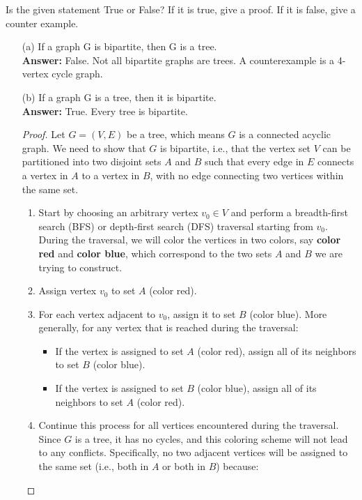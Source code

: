 \documentclass[12pt]{article}
\begin{document}
Is the given statement True or False? If it is true, give a proof. If it is false, give a counter example.
\begin{itemize}
    \item[(a)] If a graph G is bipartite, then G is a tree. \\
    \textbf{Answer:} False. Not all bipartite graphs are trees. A counterexample is a 4-vertex cycle graph.
    \item[(b)] If a graph G is a tree, then it is bipartite. \\
    \textbf{Answer:} True. Every tree is bipartite.
    \begin{proof}
    Let \( G = (V, E) \) be a tree, which means \( G \) is a connected acyclic graph. We need to show that \( G \) is bipartite, i.e., that the vertex set \( V \) can be partitioned into two disjoint sets \( A \) and \( B \) such that every edge in \( E \) connects a vertex in \( A \) to a vertex in \( B \), with no edge connecting two vertices within the same set.
    \begin{enumerate}
        \item Start by choosing an arbitrary vertex \( v_0 \in V \) and perform a breadth-first search (BFS) or depth-first search (DFS) traversal starting from \( v_0 \). During the traversal, we will color the vertices in two colors, say \textbf{color red} and \textbf{color blue}, which correspond to the two sets \( A \) and \( B \) we are trying to construct.
        \item Assign vertex \( v_0 \) to set \( A \) (color red).
        \item For each vertex adjacent to \( v_0 \), assign it to set \( B \) (color blue). More generally, for any vertex that is reached during the traversal:
        \begin{itemize}
            \item If the vertex is assigned to set \( A \) (color red), assign all of its neighbors to set \( B \) (color blue).
            \item If the vertex is assigned to set \( B \) (color blue), assign all of its neighbors to set \( A \) (color red).
        \end{itemize}
        \item Continue this process for all vertices encountered during the traversal. Since \( G \) is a tree, it has no cycles, and this coloring scheme will not lead to any conflicts. Specifically, no two adjacent vertices will be assigned to the same set (i.e., both in \( A \) or both in \( B \)) because:

\end{enumerate}
\end{proof}
\end{itemize}
\end{document}
